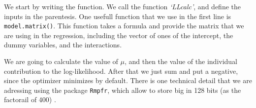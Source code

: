 \documentclass[]{book}
\newenvironment{Shaded}{\begin{snugshade}}{\end{snugshade}}
\newcommand{\KeywordTok}[1]{\textcolor[rgb]{0.13,0.29,0.53}{\textbf{#1}}}
\newcommand{\DataTypeTok}[1]{\textcolor[rgb]{0.13,0.29,0.53}{#1}}
\newcommand{\DecValTok}[1]{\textcolor[rgb]{0.00,0.00,0.81}{#1}}
\newcommand{\StringTok}[1]{\textcolor[rgb]{0.31,0.60,0.02}{#1}}
\newcommand{\CommentTok}[1]{\textcolor[rgb]{0.56,0.35,0.01}{\textit{#1}}}
\newcommand{\ControlFlowTok}[1]{\textcolor[rgb]{0.13,0.29,0.53}{\textbf{#1}}}
\newcommand{\OperatorTok}[1]{\textcolor[rgb]{0.81,0.36,0.00}{\textbf{#1}}}
\newcommand{\NormalTok}[1]{#1}
\begin{document}
We start by writing the function. We call the function \emph{`LLcalc'},
and define the inputs in the parentesis. One usefull function that we
use in the first line is \texttt{model.matrix()}. This function takes a
formula and provide the matrix that we are using in the regression,
including the vector of ones of the intercept, the dummy variables, and
the interactions.

We are going to calculate the value of \(\mu\), and then the value of
the individual contribution to the log-likelihood. After that we just
sum and put a negative, since the optimizer minimizes by default. There
is one technical detail that we are adressing using the package
\texttt{Rmpfr}, which allow to store big in 128 bits (as the factorail
of 400) \citep{R-Rmpfr}.

\begin{Shaded}
\end{Shaded}
\end{document}

